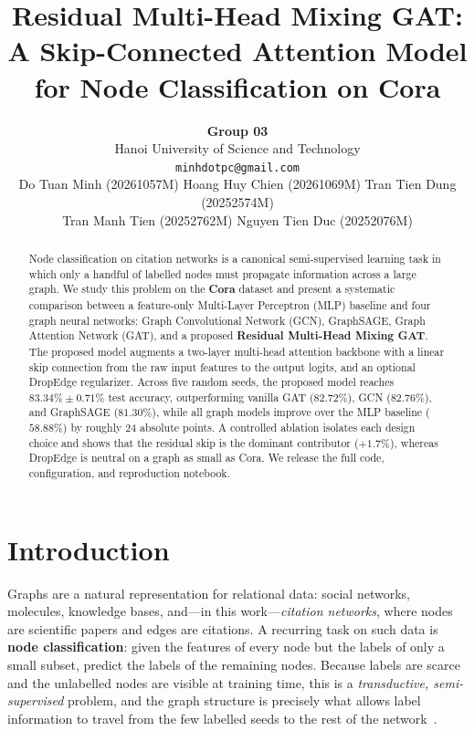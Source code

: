 \documentclass{article}
\title{Residual Multi-Head Mixing GAT:\\
A Skip-Connected Attention Model for Node Classification on Cora}
\author{%
  \textbf{Group 03} \\
  Hanoi University of Science and Technology \\
  \texttt{minhdotpc@gmail.com} \\
  \AND
  Do Tuan Minh (20261057M) \quad Hoang Huy Chien (20261069M) \quad
  Tran Tien Dung (20252574M) \\
  Tran Manh Tien (20252762M) \quad Nguyen Tien Duc (20252076M)
}
\begin{document}
\maketitle

\begin{abstract}
Node classification on citation networks is a canonical semi-supervised learning
task in which only a handful of labelled nodes must propagate information across a
large graph. We study this problem on the \textbf{Cora} dataset and present a
systematic comparison between a feature-only Multi-Layer Perceptron (MLP) baseline
and four graph neural networks: Graph Convolutional Network (GCN), GraphSAGE, Graph
Attention Network (GAT), and a proposed \textbf{Residual Multi-Head Mixing GAT}.
The proposed model augments a two-layer multi-head attention backbone with a linear
skip connection from the raw input features to the output logits, and an optional
DropEdge regularizer. Across five random seeds, the proposed model reaches
$83.34\% \pm 0.71\%$ test accuracy, outperforming vanilla GAT ($82.72\%$), GCN
($82.76\%$), and GraphSAGE ($81.30\%$), while all graph models improve over the MLP
baseline ($58.88\%$) by roughly 24 absolute points. A controlled ablation isolates
each design choice and shows that the residual skip is the dominant contributor
($+1.7\%$), whereas DropEdge is neutral on a graph as small as Cora. We release the
full code, configuration, and reproduction notebook.
\end{abstract}

\section{Introduction}
\label{sec:intro}

Graphs are a natural representation for relational data: social networks, molecules,
knowledge bases, and---in this work---\emph{citation networks}, where nodes are
scientific papers and edges are citations. A recurring task on such data is
\textbf{node classification}: given the features of every node but the labels of
only a small subset, predict the labels of the remaining nodes. Because labels are
scarce and the unlabelled nodes are visible at training time, this is a
\emph{transductive, semi-supervised} problem, and the graph structure is precisely
what allows label information to travel from the few labelled seeds to the rest of
the network~\cite{yang2016planetoid,sen2008collective}.
\end{document}
